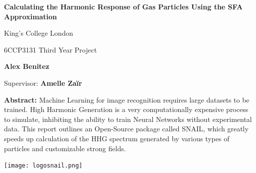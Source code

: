 \documentclass[11pt,a4paper]{report}
\date{}
\author{Alex Benitez}
\begin{document}
\begin{titlepage}
    \centering
    \vspace*{3cm} %
    
    {\LARGE\bfseries Calculating the Harmonic Response of Gas Particles Using the SFA Approximation \par}
    
    \vspace{0.5cm}
    
    {\Large King's College London \par}
    
    \vspace{0.5cm}
    
    {\large 6CCP3131 Third Year Project \par}
    
    \vspace{0.5cm}
    
    {\large \textbf{Alex Benitez} \par}
    
    \vspace{0.5cm}
    
    {\large Supervisor: \textbf{Amelle Zaïr }\par}

    \vspace{2cm}
    {\small \textbf{Abstract:} Machine Learning for image recognition requires large datasets to be trained. High Harmonic Generation is a very computationally expensive process to simulate, inhibiting the ability to train Neural Networks without experimental data. This report outlines an Open-Source package called SNAIL, which greatly speeds up calculation of the HHG spectrum generated by various types of particles and customizable strong fields.}  %
    
    
    \vfill %
    \texttt{[image: logosnail.png]}
    
\end{titlepage}

\newpage
\tableofcontents
\newpage


\end{document}
